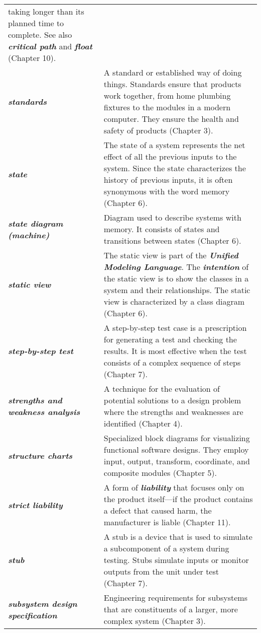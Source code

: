 \begin{longtable}[]{@{}
  >{\raggedright\arraybackslash}p{}
  >{\raggedright\arraybackslash}p{}@{}}
taking longer than its planned time to complete. See also
\emph{\textbf{critical path}} and \emph{\textbf{float}} (Chapter 10). \\
\emph{\textbf{standards}} & A standard or established way of doing
things. Standards ensure that products work together, from home plumbing
fixtures to the modules in a modern computer. They ensure the health and
safety of products (Chapter 3). \\
\emph{\textbf{state}} & The state of a system represents the net effect
of all the previous inputs to the system. Since the state characterizes
the history of previous inputs, it is often synonymous with the word
memory (Chapter 6). \\
\emph{\textbf{state diagram (machine)}} & Diagram used to describe
systems with memory. It consists of states and transitions between
states (Chapter 6). \\
\emph{\textbf{static view}} & The static view is part of the
\emph{\textbf{Unified Modeling Language}}. The \emph{\textbf{intention}}
of the static view is to show the classes in a system and their
relationships. The static view is characterized by a class diagram
(Chapter 6). \\
\emph{\textbf{step-by-step test}} & A step-by-step test case is a
prescription for generating a test and checking the results. It is most
effective when the test consists of a complex sequence of steps (Chapter
7). \\
\emph{\textbf{strengths and weakness analysis}} & A technique for the
evaluation of potential solutions to a design problem where the
strengths and weaknesses are identified (Chapter 4). \\
\emph{\textbf{structure charts}} & Specialized block diagrams for
visualizing functional software designs. They employ input, output,
transform, coordinate, and composite modules (Chapter 5). \\
\emph{\textbf{strict liability}} & A form of \emph{\textbf{liability}}
that focuses only on the product itself---if the product contains a
defect that caused harm, the manufacturer is liable (Chapter 11). \\
\emph{\textbf{stub}} & A stub is a device that is used to simulate a
subcomponent of a system during testing. Stubs simulate inputs or
monitor outputs from the unit under test (Chapter 7). \\
\emph{\textbf{subsystem design specification}} & Engineering
requirements for subsystems that are constituents of a larger, more
complex system (Chapter 3). \\

\end{longtable}
